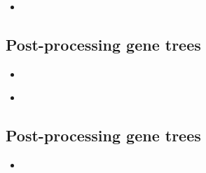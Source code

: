 \documentclass[compress, ucs, xelatex, 11pt, xcolor=x11names, aspectratio=1609,
	hyperref={
		bookmarks=true,
		unicode=true,
		colorlinks=true,
		pdftitle={HybSeq course},
		plainpages=false,
		pdfauthor={Vojtech Zeisek},
		pdfsubject={Practical processing of HybSeq target enrichment sequencing data on computing grids like MetaCentrum},
		pdfcreator={XeLaTeX},
		pdfkeywords={BASH, command line, GNU, HybSeq, Linux, MetaCentrum, sequencing shell, target enrichment},
		linkcolor=Cyan2, %
		anchorcolor=Firebrick2, %
		citecolor=Firebrick2, %
		filecolor=Firebrick2, %
		menucolor=Firebrick2, %
		urlcolor=Chartreuse2, %
		pdftex},
	url={hyphens, lowtilde} %
	]{beamer}
\begin{document}
\begin{frame}[fragile]{}
	\begin{itemize}
		\item 
	\end{itemize}
	\begin{spluscode}
    
	\end{spluscode}
	\begin{bashcode}
    
	\end{bashcode}
\end{frame}

\subsection{Post-processing gene trees}

\begin{frame}[fragile]{}
	\begin{itemize}
		\item 
	\end{itemize}
	\begin{spluscode}
    
	\end{spluscode}
	\begin{bashcode}
    
	\end{bashcode}
\end{frame}

\begin{frame}[fragile]{}
	\begin{itemize}
		\item 
	\end{itemize}
	\begin{spluscode}
    
	\end{spluscode}
	\begin{bashcode}
    
	\end{bashcode}
\end{frame}

\subsection{Post-processing gene trees}

\begin{frame}[fragile]{}
	\begin{itemize}
		\item 
	\end{itemize}
	\begin{spluscode}
    
	\end{spluscode}
	\begin{bashcode}
    
	\end{bashcode}
\end{frame}
\end{document}

